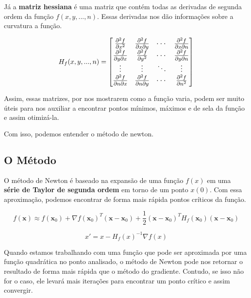 Já a \textbf{matriz hessiana} é uma matriz que contém todas as derivadas de segunda ordem da função $f(x, y, ..., n)$. Essas derivadas nos dão informações sobre a curvatura a função.

    \begin{equation}
        \large H_f(x,y,...,n) =
        \begin{bmatrix}
        \frac{\partial^2 f}{\partial x^2} & \frac{\partial^2 f}{\partial x\partial y} & \cdots & \frac{\partial^2 f}{\partial x \partial n} \\
        \frac{\partial^2 f}{\partial y \partial x} & \frac{\partial^2 f}{\partial y^2} & \cdots & \frac{\partial^2 f}{\partial y \partial n} \\
        \vdots & \vdots & \ddots & \vdots \\
        \frac{\partial^2 f}{\partial n \partial x} & \frac{\partial^2 f}{\partial n \partial y} & \cdots & \frac{\partial^2 f}{\partial n^2}
        \end{bmatrix}
    \end{equation}

Assim, essas matrizes, por nos mostrarem como a função varia, podem ser muito úteis para nos auxiliar a encontrar pontos mínimos, máximos e de sela da função e assim otimizá-la.

Com isso, podemos entender o método de newton.

\subsection{O Método}

O método de Newton é baseado na expansão de uma função $f(x)$ em uma \textbf{série de Taylor de segunda ordem} em torno de um ponto $x(0)$. Com essa aproximação, podemos encontrar de forma mais rápida pontos críticos da função.

    \begin{equation}
         f(\mathbf{x}) \approx f(\mathbf{x}_0) + \nabla f(\mathbf{x}_0)^T (\mathbf{x} - \mathbf{x}_0) + \frac{1}{2} (\mathbf{x} - \mathbf{x}_0)^T H_f(\mathbf{x}_0) (\mathbf{x} - \mathbf{x}_0)
    \end{equation}

    \begin{equation}
         x' = x - H_f(x)^{-1} \nabla f(x)
    \end{equation}

Quando estamos trabalhando com uma função que pode ser aproximada por uma função quadrática no ponto analisado, o método de Newton pode nos retornar o resultado de forma mais rápida que o método do gradiente. Contudo, se isso não for o caso, ele levará mais iterações para encontrar um ponto crítico e assim convergir.

